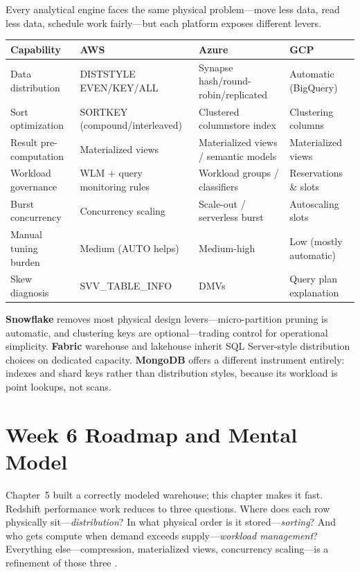 \begin{crosscloud}
Every analytical engine faces the same physical problem---move less data, read less data, schedule work fairly---but each platform exposes different levers.

\vspace{2mm}
{\footnotesize
\begin{tabular}{@{}p{2.8cm}p{3.0cm}p{3.0cm}p{3.0cm}@{}}
\toprule
\textbf{Capability} & \textbf{AWS} & \textbf{Azure} & \textbf{GCP} \\
\midrule
Data distribution & DISTSTYLE EVEN/KEY/ALL & Synapse hash/round-robin/replicated & Automatic (BigQuery) \\
Sort optimization & SORTKEY (compound/interleaved) & Clustered columnstore index & Clustering columns \\
Result pre-computation & Materialized views & Materialized views / semantic models & Materialized views \\
Workload governance & WLM + query monitoring rules & Workload groups / classifiers & Reservations \& slots \\
Burst concurrency & Concurrency scaling & Scale-out / serverless burst & Autoscaling slots \\
\addlinespace
Manual tuning burden & Medium (AUTO helps) & Medium-high & Low (mostly automatic) \\
Skew diagnosis & SVV\_TABLE\_INFO & DMVs & Query plan explanation \\
\bottomrule
\end{tabular}}

\vspace{1mm}
\textbf{Snowflake} removes most physical design levers---micro-partition pruning is automatic, and clustering keys are optional---trading control for operational simplicity. \textbf{Fabric} warehouse and lakehouse inherit SQL Server-style distribution choices on dedicated capacity. \textbf{MongoDB} offers a different instrument entirely: indexes and shard keys rather than distribution styles, because its workload is point lookups, not scans.
\end{crosscloud}

\section{Week 6 Roadmap and Mental Model}
Chapter~5 built a correctly modeled warehouse; this chapter makes it fast. Redshift performance work reduces to three questions. Where does each row physically sit---\emph{distribution}? In what physical order is it stored---\emph{sorting}? And who gets compute when demand exceeds supply---\emph{workload management}? Everything else---compression, materialized views, concurrency scaling---is a refinement of those three \cite{awsRedshiftPerfTuning}.

